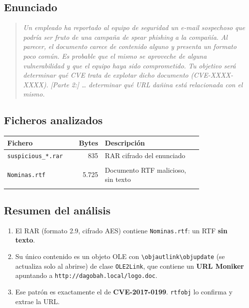 \documentclass[11pt,a4paper]{article}
\newcommand{\bs}{\textbackslash\allowbreak{}}
\begin{document}
\subsection{Enunciado}
\begin{quote}\itshape
Un empleado ha reportado al equipo de seguridad un e-mail sospechoso que podría ser fruto de una campaña de spear
phishing a la compañía. Al parecer, el documento carece de contenido alguno y presenta un formato poco común. Es
probable que el mismo se aproveche de alguna vulnerabilidad y que el equipo haya sido comprometido. Tu objetivo será
determinar qué CVE trata de explotar dicho documento (CVE-XXXX-XXXX). \textup{[Parte 2:]} \dots{} determinar qué URL
dañina está relacionada con el mismo.
\end{quote}

\subsection{Ficheros analizados}
\begin{longtable}{@{}L{0.30\linewidth}r L{0.50\linewidth}@{}}
\toprule \textbf{Fichero} & \textbf{Bytes} & \textbf{Descripción} \\ \midrule \endhead
\texttt{suspicious\_\allowbreak{}*.rar} & 835 & RAR cifrado del enunciado \\ \nopagebreak
{} \\ \midrule
\texttt{Nominas.rtf} & 5.725 & Documento RTF malicioso, sin texto \\ \nopagebreak
{} \\ \midrule
\end{longtable}

\subsection{Resumen del análisis}
\begin{enumerate}
  \item El RAR (formato 2.9, cifrado AES) contiene \texttt{Nominas.rtf}: un RTF \textbf{sin texto}.
  \item Su único contenido es un objeto OLE con \texttt{\bs objautlink\bs objupdate} (se actualiza solo al abrirse) de
        clase \texttt{OLE2Link}, que contiene un \textbf{URL Moniker} apuntando a \texttt{http://dagobah.local/logo.doc}.
  \item Ese patrón es exactamente el de \textbf{CVE-2017-0199}. \texttt{rtfobj} lo confirma y extrae la URL.
\end{enumerate}
\end{document}
